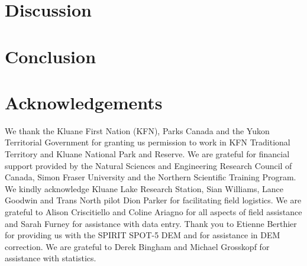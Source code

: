 \documentclass[twocolumn,letterpaper]{igs}
\begin{document}
\section{Discussion}



\section{Conclusion}


\section{Acknowledgements}

We thank the Kluane First Nation (KFN), Parks Canada and the Yukon Territorial Government for granting us permission to work in KFN Traditional Territory and Kluane National Park and Reserve. We are grateful for financial support provided by the Natural Sciences and Engineering Research Council of  Canada, Simon Fraser University and the Northern Scientific Training Program. We kindly acknowledge Kluane Lake Research Station, Sian Williams, Lance Goodwin and Trans North pilot Dion Parker for facilitating field logistics. We are grateful to Alison Criscitiello and Coline Ariagno for all aspects of field assistance and Sarah Furney for assistance with data entry. Thank you to Etienne Berthier for providing us with the SPIRIT SPOT-5 DEM and for assistance in DEM correction. We are grateful to Derek Bingham and Michael Grosskopf for assistance with statistics. 



%
%

%


\end{document}
